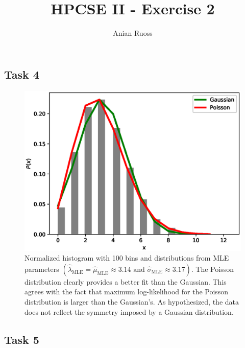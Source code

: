 \documentclass[11pt]{article}
\begin{document}
    \title{HPCSE II - Exercise 2}
    \author{Anian Ruoss}
    \maketitle

    \subsection*{Task 4}
    \label{subsec:Task4}

    \begin{figure}[H]
        \begin{center}
            \includegraphics[width=.75\textwidth]{plots/hist_distributions.eps}
        \end{center}
        \caption{Normalized histogram with 100 bins and distributions from MLE
        parameters
        $\left(
        \hat{\lambda}_{\text{MLE}} = \hat{\mu}_{\text{MLE}} \approx 3.14
        \text{ and } \hat{\sigma}_{\text{MLE}} \approx 3.17 \right)$.
        The Poisson distribution clearly provides a better fit than the
        Gaussian.
        This agrees with the fact that maximum log-likelihood for the
        Poisson distribution is larger than the Gaussian's.
        As hypothesized, the data does not reflect the symmetry imposed by a
        Gaussian distribution.}
    \end{figure}

    \subsection*{Task 5}
    \label{subsec:Task5}
\end{document}
